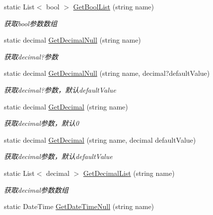 \begin{DoxyCompactItemize}
static List$<$ bool $>$ \hyperlink{class_x_c_l_net_tools_1_1_string_hander_1_1_form_helper_a134c9765f209b53268358ab4f2bf2821}{Get\-Bool\-List} (string name)
\begin{DoxyCompactList}\small\item\em 获取bool参数数组 \end{DoxyCompactList}\item 
static decimal \hyperlink{class_x_c_l_net_tools_1_1_string_hander_1_1_form_helper_a67ca5ec273b5b94c20a6fd79b0e3c3f7}{Get\-Decimal\-Null} (string name)
\begin{DoxyCompactList}\small\item\em 获取decimal?参数 \end{DoxyCompactList}\item 
static decimal \hyperlink{class_x_c_l_net_tools_1_1_string_hander_1_1_form_helper_ac94db6da5663acdc23ce3bc79ec99c12}{Get\-Decimal\-Null} (string name, decimal?default\-Value)
\begin{DoxyCompactList}\small\item\em 获取decimal?参数，默认default\-Value \end{DoxyCompactList}\item 
static decimal \hyperlink{class_x_c_l_net_tools_1_1_string_hander_1_1_form_helper_a61ef0cfc5b32dadd67700c5f307850d3}{Get\-Decimal} (string name)
\begin{DoxyCompactList}\small\item\em 获取decimal参数，默认0 \end{DoxyCompactList}\item 
static decimal \hyperlink{class_x_c_l_net_tools_1_1_string_hander_1_1_form_helper_ab147eaeb86996c9c03099a5bd6d6ac6d}{Get\-Decimal} (string name, decimal default\-Value)
\begin{DoxyCompactList}\small\item\em 获取decimal参数，默认default\-Value \end{DoxyCompactList}\item 
static List$<$ decimal $>$ \hyperlink{class_x_c_l_net_tools_1_1_string_hander_1_1_form_helper_ab3f5108e85eb8bf10ab5317e77bc1f2c}{Get\-Decimal\-List} (string name)
\begin{DoxyCompactList}\small\item\em 获取decimal参数数组 \end{DoxyCompactList}\item 
static Date\-Time \hyperlink{class_x_c_l_net_tools_1_1_string_hander_1_1_form_helper_a420660ded9f4960446f03cede154198b}{Get\-Date\-Time\-Null} (string name)

\end{DoxyCompactItemize}
